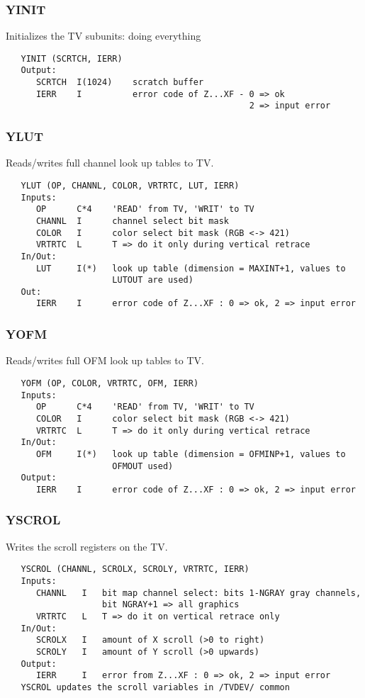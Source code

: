 \subsubsection{YINIT}
Initializes the TV subunits: doing everything
\begin{verbatim}
   YINIT (SCRTCH, IERR)
   Output:
      SCRTCH  I(1024)    scratch buffer
      IERR    I          error code of Z...XF - 0 => ok
                                                2 => input error

\end{verbatim}

\subsubsection{YLUT}
Reads/writes full channel look up tables to TV.
\begin{verbatim}
   YLUT (OP, CHANNL, COLOR, VRTRTC, LUT, IERR)
   Inputs:
      OP      C*4    'READ' from TV, 'WRIT' to TV
      CHANNL  I      channel select bit mask
      COLOR   I      color select bit mask (RGB <-> 421)
      VRTRTC  L      T => do it only during vertical retrace
   In/Out:
      LUT     I(*)   look up table (dimension = MAXINT+1, values to
                     LUTOUT are used)
   Out:
      IERR    I      error code of Z...XF : 0 => ok, 2 => input error

\end{verbatim}

\subsubsection{YOFM}
Reads/writes full OFM look up tables to TV.
\begin{verbatim}
   YOFM (OP, COLOR, VRTRTC, OFM, IERR)
   Inputs:
      OP      C*4    'READ' from TV, 'WRIT' to TV
      COLOR   I      color select bit mask (RGB <-> 421)
      VRTRTC  L      T => do it only during vertical retrace
   In/Out:
      OFM     I(*)   look up table (dimension = OFMINP+1, values to
                     OFMOUT used)
   Output:
      IERR    I      error code of Z...XF : 0 => ok, 2 => input error

\end{verbatim}

\subsubsection{YSCROL}
Writes the scroll registers on the TV.
\begin{verbatim}
   YSCROL (CHANNL, SCROLX, SCROLY, VRTRTC, IERR)
   Inputs:
      CHANNL   I   bit map channel select: bits 1-NGRAY gray channels,
                   bit NGRAY+1 => all graphics
      VRTRTC   L   T => do it on vertical retrace only
   In/Out:
      SCROLX   I   amount of X scroll (>0 to right)
      SCROLY   I   amount of Y scroll (>0 upwards)
   Output:
      IERR     I   error from Z...XF : 0 => ok, 2 => input error
   YSCROL updates the scroll variables in /TVDEV/ common

\end{verbatim}

